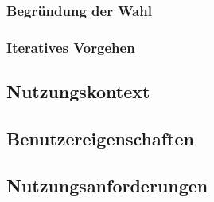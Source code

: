 \documentclass[10pt]{article}
\begin{document}
		\subsubsection{Begründung der Wahl}
		
		\subsubsection{Iteratives Vorgehen}
	\pagebreak
	\subsection{Nutzungskontext}
	\pagebreak
	\subsection{Benutzereigenschaften}
	\pagebreak
	\subsection{Nutzungsanforderungen}
\end{document}
